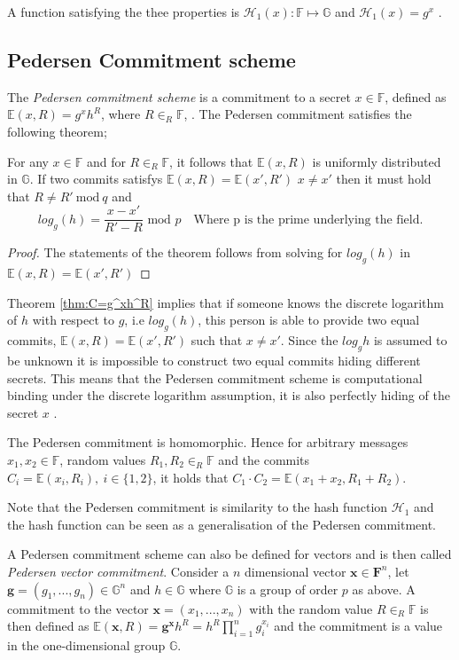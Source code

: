 A  function satisfying the thee properties is $\mathcal{H}_1(x):\mathds{F}\mapsto\mathds{G}$ and $\mathcal{H}_1(x)= g^{x}$ \cite{HHF}. 


\subsection*{Pedersen Commitment scheme}
The \textit{Pedersen commitment scheme} is a commitment to a secret $x\in\mathds{F}$, defined as $\mathds{E}(x,R)=g^xh^R$, where $R\in_R\mathds{F}$, \cite{pedersen}. The Pedersen commitment satisfies the following theorem;
\\
\begin{thm}
\label{thm:C=g^xh^R}
For any $x\in\mathds{F}$ and for $R\in_R\mathds{F}$, it follows that   $\mathds{E}(x,R)$ is uniformly distributed in $\mathds{G}$. If two commits satisfys $\mathds{E}(x,R)=\mathds{E}(x',R')$  $x\neq x'$ then it must hold that $R\neq R' \:\text{mod}\:q$ and 
\begin{equation}
\label{eq:pedersen_binidng}
    log_g(h) = \frac{x-x'}{R'-R} \text{ mod }p \quad \text{Where p is the prime underlying the field}.
\end{equation}
\end{thm}
\begin{proof}
The statements of the theorem follows from solving for $log_g(h)$ in $\mathds{E}(x,R)=\mathds{E}(x',R')$ 
\end{proof}

Theorem \ref{thm:C=g^xh^R} implies that if someone knows the discrete logarithm of $h$ with respect to $g$, i.e $log_g(h)$, this person is able to provide two equal commits, $\mathds{E}(x,R)=\mathds{E}(x',R')$ such that $x\neq x'$. Since the $log_g h$ is assumed to be unknown it is impossible to construct two equal commits hiding different secrets. This means that the Pedersen commitment scheme is computational binding under the discrete logarithm assumption, it is also perfectly hiding of the secret $x$ \cite{pedersen}. 

The Pedersen commitment is homomorphic. Hence for arbitrary messages $x_1,x_2\in\mathds{F}$, random values $R_1,R_2\in_R\mathds{F}$ and the commits $C_i=\mathds{E}(x_i,R_i),\:i\in\{1,2\}$, it holds that $C_1\cdot C_2 = \mathds{E}(x_1+x_2,R_1+R_2)$.

Note that the Pedersen commitment is similarity to the hash function $\mathcal{H}_1$ and the hash function can be seen as a generalisation of the Pedersen commitment.

A Pedersen commitment scheme can also be defined for vectors and is then called \textit{Pedersen vector commitment}. Consider a $n$ dimensional vector $\mathbf{x}\in\mathbf{F}^n$, let $\mathbf{g}=(g_1,...,g_n) \in\mathds{G}^n$ and $h\in\mathds{G}$ where $\mathds{G}$ is a group of order $p$ as above. A commitment to the vector  $\mathbf{x}=(x_1,...,x_n)$  with the random value $R\in_R \mathds{F}$ is then defined as $\mathds{E}(\mathbf{x},R) = \mathbf{g}^\mathbf{x}h^R = h^R\prod_{i=1}^n g_i^{x_i}$ and the commitment is a value in the one-dimensional group $\mathds{G}$. 

